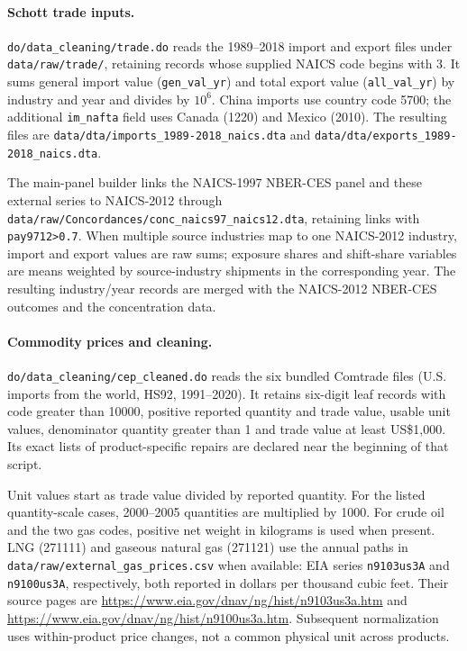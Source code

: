 \documentclass[11pt]{article}
\newcommand{\pkgfile}[1]{\nolinkurl{#1}}
\begin{document}
\paragraph{Schott trade inputs.}
\pkgfile{do/data_cleaning/trade.do} reads the 1989--2018 import and export
files under \pkgfile{data/raw/trade/}, retaining records whose supplied
NAICS code begins with 3. It sums general import value
(\pkgfile{gen_val_yr}) and total export value (\pkgfile{all_val_yr}) by
industry and year and divides by $10^6$. China imports use country code
5700; the additional \pkgfile{im_nafta} field uses Canada (1220) and Mexico
(2010). The resulting files are
\pkgfile{data/dta/imports_1989-2018_naics.dta} and
\pkgfile{data/dta/exports_1989-2018_naics.dta}.

The main-panel builder links the NAICS-1997 NBER-CES panel and these external
series to NAICS-2012 through
\pkgfile{data/raw/Concordances/conc_naics97_naics12.dta}, retaining links
with \pkgfile{pay9712>0.7}. When multiple source industries map to one
NAICS-2012 industry, import and export values are raw sums; exposure shares
and shift-share variables are means weighted by source-industry shipments
in the corresponding year. The resulting industry/year records are merged
with the NAICS-2012 NBER-CES outcomes and the concentration data.

\paragraph{Commodity prices and cleaning.}
\pkgfile{do/data_cleaning/cep_cleaned.do} reads the six bundled Comtrade
files (U.S. imports from the world, HS92, 1991--2020). It retains six-digit
leaf records with code greater than 10000, positive reported quantity and
trade value, usable unit values, denominator quantity greater than 1 and
trade value at least US\$1,000. Its exact lists of product-specific repairs
are declared near the beginning of that script.

Unit values start as trade value divided by reported quantity. For the
listed quantity-scale cases, 2000--2005 quantities are multiplied by 1000.
For crude oil and the two gas codes, positive net weight in kilograms is
used when present. LNG (271111) and gaseous natural gas (271121) use the
annual paths in \pkgfile{data/raw/external_gas_prices.csv} when available:
EIA series \pkgfile{n9103us3A} and \pkgfile{n9100us3A}, respectively,
both reported in dollars per thousand cubic feet. Their source pages are
\url{https://www.eia.gov/dnav/ng/hist/n9103us3a.htm} and
\url{https://www.eia.gov/dnav/ng/hist/n9100us3a.htm}.
Subsequent normalization uses within-product price changes, not a common
physical unit across products.
\end{document}
